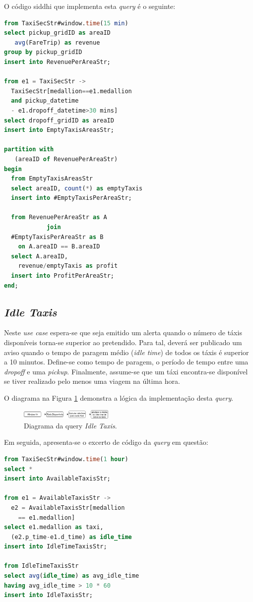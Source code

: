 \documentclass[article]{IEEEtran}
\begin{document}
O código siddhi que implementa esta \textit{query} é o seguinte:

\begin{lstlisting}[language=SQL]
from TaxiSecStr#window.time(15 min)
select pickup_gridID as areaID
   avg(FareTrip) as revenue
group by pickup_gridID
insert into RevenuePerAreaStr;

from e1 = TaxiSecStr ->
  TaxiSecStr[medallion==e1.medallion 
  and pickup_datetime 
  - e1.dropoff_datetime>30 mins]
select dropoff_gridID as areaID
insert into EmptyTaxisAreasStr;

partition with 
   (areaID of RevenuePerAreaStr)
begin
  from EmptyTaxisAreasStr
  select areaID, count(*) as emptyTaxis
  insert into #EmptyTaxisPerAreaStr;

  from RevenuePerAreaStr as A 
            join
  #EmptyTaxisPerAreaStr as B 
    on A.areaID == B.areaID
  select A.areaID,
    revenue/emptyTaxis as profit
  insert into ProfitPerAreaStr;
end;
\end{lstlisting}

\subsection{\textit{Idle Taxis}}

Neste \textit{use case} espera-se que seja emitido um alerta quando o número de táxis disponíveis torna-se superior ao pretendido. Para tal, deverá ser publicado um aviso quando o tempo de paragem médio (\textit{idle time}) de todos os táxis é superior a 10 minutos. Define-se como tempo de paragem, o período de tempo entre uma \textit{dropoff} e uma \textit{pickup}. Finalmente, assume-se que um táxi encontra-se disponível se tiver realizado pelo menos uma viagem na última hora.

O diagrama na Figura \ref{fig:idleTaxisDiagram} demonstra a lógica da implementação desta \textit{query}.

\begin{figure}[hbtp]
    \centering
        \includegraphics[width=0.4\textwidth]{images/idleTaxisDiagram}
    \caption{Diagrama da query \textit{Idle Taxis}.}
    \label{fig:idleTaxisDiagram}
\end{figure}

Em seguida, apresenta-se o excerto de código da \textit{query} em questão:
\begin{lstlisting}[language=SQL]
from TaxiSecStr#window.time(1 hour)
select *
insert into AvailableTaxisStr;

from e1 = AvailableTaxisStr -> 
  e2 = AvailableTaxisStr[medallion
    == e1.medallion]
select e1.medallion as taxi,
  (e2.p_time-e1.d_time) as idle_time
insert into IdleTimeTaxisStr;

from IdleTimeTaxisStr
select avg(idle_time) as avg_idle_time
having avg_idle_time > 10 * 60
insert into IdleTaxisStr;
\end{lstlisting}
\end{document}
